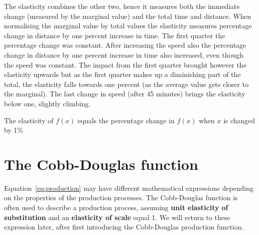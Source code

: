 \documentclass[11pt,fleqn]{book} %
\begin{document}
\begin{theorem}
The elasticity combines the other two, hence it measures both the immediate change (measured by the marginal value) and the total time and distance. When normalising the marginal value by total values the elasticity measures percentage change in distance by one percent increase in time. The first quarter the percentage change was constant. After increasing the speed also the percentage change in distance by one percent increase in time also increased, even though the speed was constant. The impact from the first quarter brought however the elasticity upwards but as the first quarter makes up a diminishing part of the total, the elasticity falls towards one percent (as the average value gets closer to the marginal). The last change in speed (after 45 minutes) brings the elasticity below one, slightly climbing.
\label{code:distancespeed}
\end{theorem}

\begin{definition}
\hfill\break
The elasticity of $f(x)$ equals the percentage change in $f(x)$ when $x$ is changed by 1\%
\end{definition}

\begin{figure}[!htb]
\end{figure}

\section{The Cobb-Douglas function}

Equation~\ref{eq:production} may have different mathematical expressions depending on the properties of the production processes. The Cobb-Douglas function is often used to describe a production process, assuming \textbf{unit elasticity of substitution} and an \textbf{elasticity of scale} equal 1. We will return to these expression later, after first introducing the Cobb-Douglas production function.
\end{document}
